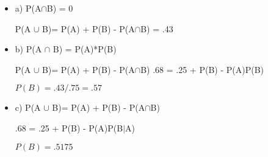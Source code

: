\documentclass{../oxmathproblems}
\begin{document}
\begin{questions}
\begin{itemize}
\item a) 
P(A$\cap$B) = 0 


P(A $\cup$ B)= P(A) + P(B) - P(A$\cap$B) = .43
\item b)
P(A $\cap$ B) = P(A)*P(B) 

P(A $\cup$ B)= P(A) + P(B) - P(A$\cap$B)
.68 = .25 + P(B) - P(A)P(B) 

$P(B) = .43/.75 = .57$
\item c)
P(A $\cup$ B)= P(A) + P(B) - P(A$\cap$B) 

.68 = .25 + P(B) - P(A)P(B$\mid$A) 

$ P(B)= .5175$ 

\end{itemize}


\end{questions}
\end{document}
